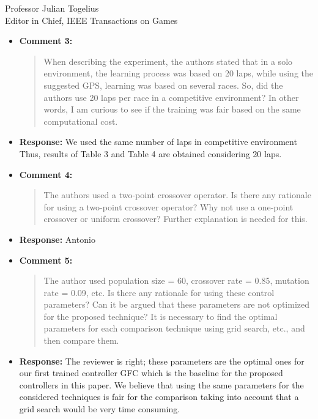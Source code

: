 \documentclass[10pt]{letter} %
\begin{document}
\begin{letter}{Professor Julian Togelius \\ Editor in Chief, IEEE Transactions on Games}
\begin{enumerate}
\begin{itemize}
\begin{itemize}
	\end{itemize}			
		\item {\bf Comment 3:}
		\begin{quote}
		When describing the experiment, the authors stated that in a solo environment, the learning process was based on 20 laps, while using the suggested GPS, learning was based on several races. So, did the authors use 20 laps per race in a competitive environment? In other words, I am curious to see if the training was fair based on the same computational cost.
			\end{quote}	
		\item {\bf Response:} 
		We used the same number of laps in competitive environment Thus, results of Table 3 and Table 4 are obtained considering 20 laps.
		\item {\bf Comment 4:}
		\begin{quote}
The authors used a two-point crossover operator. Is there any rationale for using a two-point crossover operator? Why not use a one-point crossover or uniform crossover? Further explanation is needed for this.
			\end{quote}	
		\item {\bf Response:} 
		Antonio
		\item {\bf Comment 5:}
		\begin{quote}
The author used population size = 60, crossover rate = 0.85, mutation rate = 0.09, etc. Is there any rationale for using these control parameters? Can it be argued that these parameters are not optimized for the proposed technique? It is necessary to find the optimal parameters for each comparison technique using grid search, etc., and then compare them.
			\end{quote}	
		\item {\bf Response:} 
		The reviewer is right; these parameters are the optimal ones for our first trained controller GFC which is the baseline for the proposed controllers in this paper. We believe that using the same parameters for the considered techniques is fair for the comparison taking into account that a grid search would be very time consuming. 
		

\end{itemize}
\end{enumerate}
\end{letter}
\end{document}
